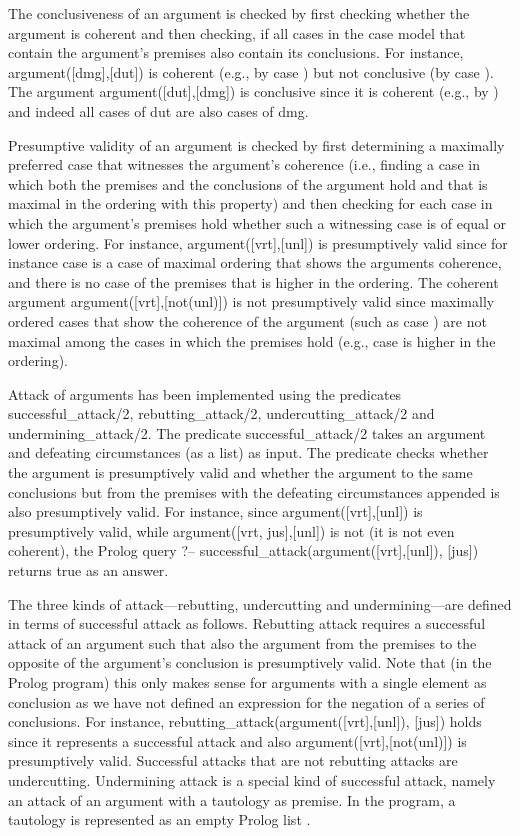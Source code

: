 \documentclass{IOS-Book-Article}
\begin{document}
The conclusiveness of an argument is checked by first checking whether the argument is coherent and then checking, if all cases in the case model that contain the argument's premises also contain its conclusions. For instance, {\mf argument([dmg],[dut])} is coherent (e.g., by case {}) but not conclusive (by case {}). The argument {\mf argument([dut],[dmg])} is conclusive since it is coherent (e.g., by {}) and indeed all cases of {\mf dut} are also cases of {\mf dmg}.

Presumptive validity of an argument is checked by first determining a maximally preferred case that witnesses the argument's coherence (i.e., finding a case in which both the premises and the conclusions of the argument hold and that is maximal in the ordering with this property) and then checking for each case in which the argument's premises hold whether such a witnessing case is of equal or lower ordering. For instance, {\mf argument([vrt],[unl])} is presumptively valid since for instance case {} is a case of maximal ordering that shows the arguments coherence, and there is no case of the premises that is higher in the ordering. The coherent argument {\mf argument([vrt],[not(unl)])} is not presumptively valid since maximally ordered cases that show the coherence of the argument (such as case {}) are not maximal among the cases in which the premises hold (e.g., case {} is higher in the ordering).

Attack of arguments has been implemented using the predicates {\mf successful\_attack/2}, {\mf rebutting\_attack/2}, {\mf undercutting\_attack/2} and {\mf undermining\_attack/2}. The predicate {\mf successful\_attack/2} takes an argument and defeating circumstances (as a list) as input. The predicate checks whether the argument is presumptively valid and whether the argument to the same conclusions but from the premises with the defeating circumstances appended is also presumptively valid. For instance, since {\mf argument([vrt],[unl])} is presumptively valid, while {\mf argument([vrt, jus],[unl])} is not (it is not even coherent), the Prolog query {\mf ?-- successful\_attack(argument([vrt],[unl]), [jus])} returns {\mf true} as an answer.

The three kinds of attack---rebutting, undercutting and undermining---are defined in terms of successful attack as follows. Rebutting attack requires a successful attack of an argument such that also the argument from the premises to the opposite of the argument's conclusion is presumptively valid. Note that (in the Prolog program) this only makes sense for arguments with a single element as conclusion as we have not defined an expression for the negation of a series of conclusions. For instance, {\mf rebutting\_attack(argument([vrt],[unl]), [jus])} holds since it represents a successful attack and also argument([vrt],[not(unl)]) is presumptively valid. Successful attacks that are not rebutting attacks are undercutting. Undermining attack is a special kind of successful attack, namely an attack of an argument with a tautology as premise. In the program, a tautology is represented as an empty Prolog list {\mf [ ]}.
\end{document}
